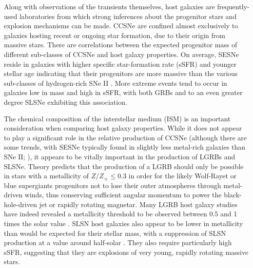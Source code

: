 \documentclass[fleqn,usenatbib,]{mnras}
\begin{document}
 Along with observations of the transients themselves, host galaxies are frequently-used laboratories from which strong inferences about the progenitor stars and explosion mechanisms can be made. CCSNe are confined almost exclusively to galaxies hosting recent or ongoing star formation, due to their origin from massive stars. There are correlations between the expected progenitor mass of different sub-classes of CCSNe and host galaxy properties. On average, SESNe reside in galaxies with higher specific star-formation rate (sSFR) and younger stellar age indicating that their progenitors are more massive than the various sub-classes of hydrogen-rich SNe II \citep{James2006,Kelly2008,Galbany2018}. More extreme events tend to occur in galaxies low in mass and high in sSFR, with both GRBs \citep[e.g.][]{Fruchter2006,LeFloch2006,Levesque2010,Kruehler2015,Vergani2015,Perley2016b,Palmerio2019,Taggart2019} and to an even greater degree SLSNe \citep[e.g.][]{Neill2011,Lunnan2014,Leloudas2015,Angus2016,Schulze2018,Taggart2019} exhibiting this association.
 
 The chemical composition of the interstellar medium (ISM) is an important consideration when comparing host galaxy properties. While it does not appear to play a significant role in the relative production of CCSNe (although there are some trends, with SESNe typically found in slightly less metal-rich galaxies than SNe II; \citealt{Galbany2018}), it appears to be vitally important in the production of LGRBs and SLSNe. Theory predicts that the production of a LGRB should only be possible in stars with a metallicity of $Z/Z_{\sun}\leq 0.3$ \citep{Woosley1993}  in order for the likely Wolf-Rayet or blue supergiants progenitors not to lose their outer atmospheres through metal-driven winds, thus conserving sufficient angular momentum to power the black-hole-driven jet or rapidly rotating magnetar. Many LGRB host galaxy studies have indeed revealed a metallicity threshold to be observed between 0.5 and 1 times the solar value \citep[e.g.][]{Stanek2006,Modjaz2008,Kruehler2015,Perley2016b,Japelj2016,Vergani2017}.  
SLSN host galaxies also appear to be lower in metallicity than would be expected for their stellar mass, with a suppression of SLSN production at a value around half-solar \citep{Lunnan2014,Chen2016a,Perley2016c}. They also require particularly high sSFR, suggesting that they are explosions of very young, rapidly rotating massive stars.
 
\end{document}
